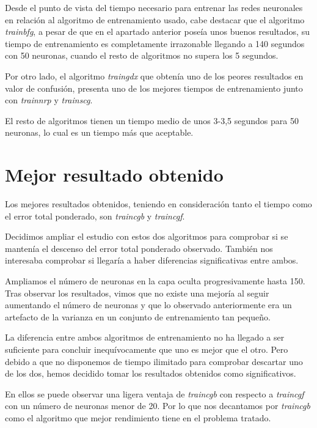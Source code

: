 \documentclass[a4paper,12pt,titlepage]{article}
\begin{document}
Desde el punto de vista del tiempo necesario para entrenar las redes neuronales en relación al algoritmo de entrenamiento usado, cabe destacar que el algoritmo \textit{trainbfg}, a pesar de que en el apartado anterior poseía unos buenos resultados, su tiempo de entrenamiento es completamente irrazonable llegando a 140 segundos con 50 neuronas, cuando el resto de algoritmos no supera los 5 segundos. 

Por otro lado, el algoritmo \textit{traingdx} que obtenía uno de los peores resultados en valor de confusión, presenta uno de los mejores tiempos de entrenamiento junto con \textit{trainnrp} y \textit{trainscg}.

El resto de algoritmos tienen un tiempo medio de unos 3-3,5 segundos para 50 neuronas, lo cual es un tiempo más que aceptable.

\section{Mejor resultado obtenido}

Los mejores resultados obtenidos, teniendo en consideración tanto el tiempo como el error total ponderado, son \textit{traincgb} y \textit{traincgf}.

Decidimos ampliar el estudio con estos dos algoritmos para comprobar si se mantenía el descenso del error total ponderado observado. También nos interesaba comprobar si llegaría a haber diferencias significativas entre ambos.

Ampliamos el número de neuronas en la capa oculta progresivamente hasta 150. Tras observar los resultados, vimos que  no existe una mejoría al seguir aumentando el número de neuronas y que lo observado anteriormente era un artefacto de la varianza en un conjunto de entrenamiento tan pequeño.

La diferencia entre ambos algoritmos de entrenamiento no ha llegado a ser suficiente para concluir inequívocamente que uno es mejor que el otro. Pero debido a que no disponemos de tiempo ilimitado para comprobar descartar uno de los dos, hemos decidido tomar los resultados obtenidos como significativos.

En ellos se puede observar una ligera ventaja de \textit{traincgb} con respecto a \textit{traincgf} con un número de neuronas menor de 20. Por lo que nos decantamos por \textit{traincgb} como el algoritmo que mejor rendimiento tiene en el problema tratado.
\end{document}
